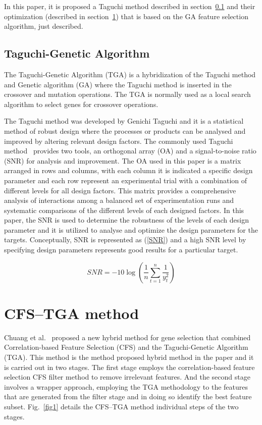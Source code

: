 \documentclass[runningheads]{llncs}
\begin{document}
In this paper, it is proposed a Taguchi method described in section~\ref{Taguchi-Genetic Algorithm} and their optimization (described in section~\ref{CFS–TGA method}) that is based on the GA feature selection algorithm, just described.

\subsection{Taguchi-Genetic Algorithm}\label{Taguchi-Genetic Algorithm}
The Taguchi-Genetic Algorithm (TGA) is a hybridization of the Taguchi method and Genetic algorithm (GA) where the Taguchi method is inserted in the crossover and mutation operations. The TGA is normally used as a local search algorithm to select genes for crossover operations. 

The Taguchi method was developed by Genichi Taguchi and it is a statistical method of robust design where the processes or products can be analysed and improved by altering relevant design factors. The commonly used Taguchi method~\cite{tsai2004hybrid,taguchi1999robust,wu2000taguchi} provides two tools, an orthogonal array (OA) and a signal-to-noise ratio (SNR) for analysis and improvement. The OA used in this paper is a matrix arranged in rows and columns, with each column it is indicated a specific design parameter and each row represent an experimental trial with a combination of different levels for all design factors. This matrix provides a comprehensive analysis of interactions among a balanced set of experimentation runs and systematic comparisons of the different levels of each designed factors. In this paper, the SNR is used to determine the robustness of the levels of each design parameter and it is utilized to analyse and optimize the design parameters for the targets. Conceptually, SNR is represented as (\ref{SNR}) and a high SNR level by specifying design parameters represents good results for a particular target.

\begin{equation}\label{SNR}
	SNR = -10\log\left(\frac{1}{n}\sum_{t = 1}^{n}\frac{1}{y^2_{t}}\right)
\end{equation}

\section{CFS–TGA method}\label{CFS–TGA method}
Chuang et al.~\cite{chuang2011hybrid} proposed a new hybrid method for gene selection that combined Correlation-based Feature Selection (CFS) and the Taguchi-Genetic Algorithm (TGA). This method is the method proposed hybrid method in the paper and it is carried out in two stages. The first stage employs the correlation-based feature selection CFS filter method to remove irrelevant features. And the second stage involves a wrapper approach, employing the TGA methodology to the features that are generated from the filter stage and in doing so identify the best feature subset. Fig.~\ref{fig1} details the CFS–TGA method individual steps of the two stages.
\end{document}
